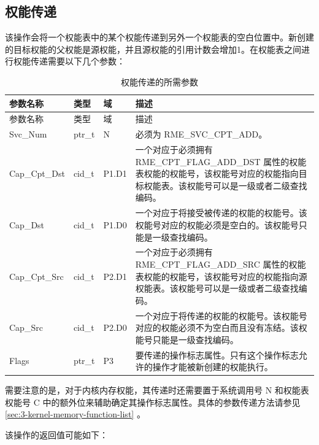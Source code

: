 \subsection{权能传递}\label{subsec:2-transfer-a-capability}

该操作会将一个权能表中的某个权能传递到另外一个权能表的空白位置中。新创建的目标权能的父权能是源权能，并且源权能的引用计数会增加1。在权能表之间进行权能传递需要以下几个参数：

\begin{xltabular}{\textwidth}{@{}>{\hsize\raggedright\arraybackslash}X>{\hsize\raggedright\arraybackslash}X>{\hsize\raggedright\arraybackslash}X>{\hsize\raggedright\arraybackslash}X@{}}
\caption{权能传递的所需参数}\label{tab:2-9-capability-transfer-parameters}\\
\toprule
参数名称 & 类型 & 域 & 描述\tabularnewline
\endfirsthead
\toprule
参数名称 & 类型 & 域 & 描述\tabularnewline
\midrule
\endhead
\bottomrule
\endlastfoot
Svc\_Num & ptr\_t & N & 必须为 RME\_SVC\_CPT\_ADD。\tabularnewline
Cap\_Cpt\_Dst & cid\_t & P1.D1 &
一个对应于必须拥有 RME\_CPT\_FLAG\_ADD\_DST 属性的权能表权能的权能号，该权能号对应的权能指向目标权能表。该权能号可以是一级或者二级查找编码。\tabularnewline
Cap\_Dst & cid\_t & P1.D0 &
一个对应于将接受被传递的权能的权能号。该权能号对应的权能必须是空白的。该权能号只能是一级查找编码。\tabularnewline
Cap\_Cpt\_Src & cid\_t & P2.D1 &
一个对应于必须拥有 RME\_CPT\_FLAG\_ADD\_SRC 属性的权能表权能的权能号，该权能号对应的权能指向源权能表。该权能号可以是一级或者二级查找编码。\tabularnewline
Cap\_Src & cid\_t & P2.D0 &
一个对应于将传递的权能的权能号。该权能号对应的权能必须不为空白而且没有冻结。该权能号只能是一级查找编码。\tabularnewline
Flags & ptr\_t & P3 &
要传递的操作标志属性。只有这个操作标志允许的操作才能被新创建的权能执行。\tabularnewline
\end{xltabular}

需要注意的是，对于内核内存权能，其传递时还需要置于系统调用号 N 和权能表权能号 C 中的额外位来辅助确定其操作标志属性。具体的参数传递方法请参见\ref{sec:3-kernel-memory-function-list}
。

该操作的返回值可能如下：

